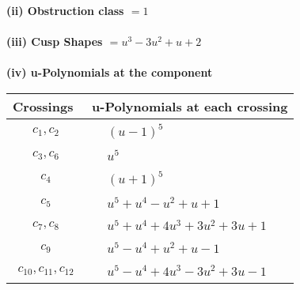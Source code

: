 \documentclass[1p]{elsarticle_modified}
\theoremstyle{definition}
\begin{document}
\flushleft \textbf{(ii) Obstruction class $= 1$}\\~\\
\flushleft \textbf{(iii) Cusp Shapes $= u^3-3 u^2+u+2$}\\~\\
\newpage\renewcommand{\arraystretch}{1}
\flushleft \textbf{(iv) u-Polynomials at the component}\newline \\
\begin{tabular}{m{50pt}|m{274pt}}
Crossings & \hspace{64pt}u-Polynomials at each crossing \\
\hline $$\begin{aligned}c_{1},c_{2}\end{aligned}$$&$\begin{aligned}
&(u-1)^5
\end{aligned}$\\
\hline $$\begin{aligned}c_{3},c_{6}\end{aligned}$$&$\begin{aligned}
&u^5
\end{aligned}$\\
\hline $$\begin{aligned}c_{4}\end{aligned}$$&$\begin{aligned}
&(u+1)^5
\end{aligned}$\\
\hline $$\begin{aligned}c_{5}\end{aligned}$$&$\begin{aligned}
&u^5+u^4- u^2+u+1
\end{aligned}$\\
\hline $$\begin{aligned}c_{7},c_{8}\end{aligned}$$&$\begin{aligned}
&u^5+u^4+4 u^3+3 u^2+3 u+1
\end{aligned}$\\
\hline $$\begin{aligned}c_{9}\end{aligned}$$&$\begin{aligned}
&u^5- u^4+u^2+u-1
\end{aligned}$\\
\hline $$\begin{aligned}c_{10},c_{11},c_{12}\end{aligned}$$&$\begin{aligned}
&u^5- u^4+4 u^3-3 u^2+3 u-1
\end{aligned}$\\
\hline
\end{tabular}\\~\\
\end{document}
